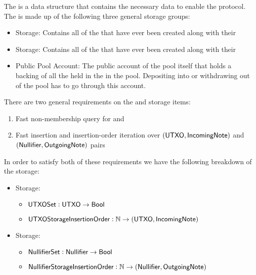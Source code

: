 
The \ShieldedPool{} is a data structure that contains the necessary data to enable the \MantaPay{} \Transfer{} protocol. The \ShieldedPool{} is made up of the following three general storage groups:

\begin{itemize}
    \item \UTXO{} Storage: Contains all of the  that have ever been created along with their 
    \item \Nullifier{} Storage: Contains all of the  that have ever been created along with their 
    \item Public Pool Account: The public account of the pool itself that holds a backing of all the  held in the  in the pool. Depositing into or withdrawing out of the pool has to go through this account.
\end{itemize}

There are two general requirements on the \UTXO{} and \Nullifier{} storage items:

\begin{enumerate}
    \item Fast non-membership query for  and 
    \item Fast insertion and insertion-order iteration over $({\textsf{UTXO}}{}, {\textsf{IncomingNote}}{})$ and $({\textsf{Nullifier}}{}, {\textsf{OutgoingNote}}{})$ pairs
\end{enumerate}

In order to satisfy both of these requirements we have the following breakdown of the storage:

\begin{itemize}
    \item \UTXO{} Storage:
        \begin{itemize}
            \item ${\textsf{UTXOSet}}: {\textsf{UTXO}} \to {\textsf{Bool}}$
            \item ${\textsf{UTXOStorageInsertionOrder}}: \mathbb{N} \to ({\textsf{UTXO}}, {\textsf{IncomingNote}})$
        \end{itemize}
    \item \Nullifier{} Storage:
        \begin{itemize}
            \item ${\textsf{NullifierSet}}: {\textsf{Nullifier}} \to {\textsf{Bool}}$
            \item ${\textsf{NullifierStorageInsertionOrder}}: \mathbb{N} \to ({\textsf{Nullifier}}, {\textsf{OutgoingNote}})$
        \end{itemize}
\end{itemize}

